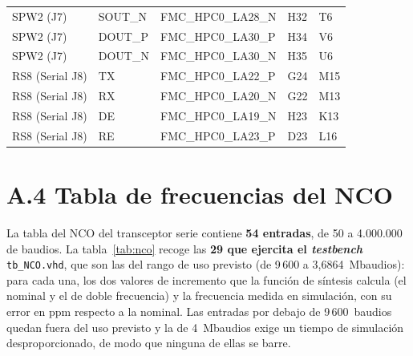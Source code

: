 {\begin{longtable}{lllll}
    SPW2 (J7) & SOUT\_N & FMC\_HPC0\_LA28\_N & H32 & T6 \\
    SPW2 (J7) & DOUT\_P & FMC\_HPC0\_LA30\_P & H34 & V6 \\
    SPW2 (J7) & DOUT\_N & FMC\_HPC0\_LA30\_N & H35 & U6 \\
    RS8 (Serial J8) & TX & FMC\_HPC0\_LA22\_P & G24 & M15 \\
    RS8 (Serial J8) & RX & FMC\_HPC0\_LA20\_N & G22 & M13 \\
    RS8 (Serial J8) & DE & FMC\_HPC0\_LA19\_N & H23 & K13 \\
    RS8 (Serial J8) & RE & FMC\_HPC0\_LA23\_P & D23 & L16 \\
    \hline
\end{longtable}
}

\section*{A.4 Tabla de frecuencias del NCO}

La tabla del NCO del transceptor serie contiene \textbf{54 entradas}, de 50 a 4.000.000 de
baudios. La tabla~\ref{tab:nco} recoge las \textbf{29 que ejercita el \textit{testbench}}
\texttt{tb\_NCO.vhd}, que son las del rango de uso previsto (de 9\,600 a 3,6864~Mbaudios): para cada
una, los dos valores de incremento que la función de síntesis calcula (el nominal y el de doble
frecuencia) y la frecuencia medida en simulación, con su error en ppm respecto a la nominal. Las
entradas por debajo de 9\,600~baudios quedan fuera del uso previsto y la de 4~Mbaudios exige un
tiempo de simulación desproporcionado, de modo que ninguna de ellas se barre.

